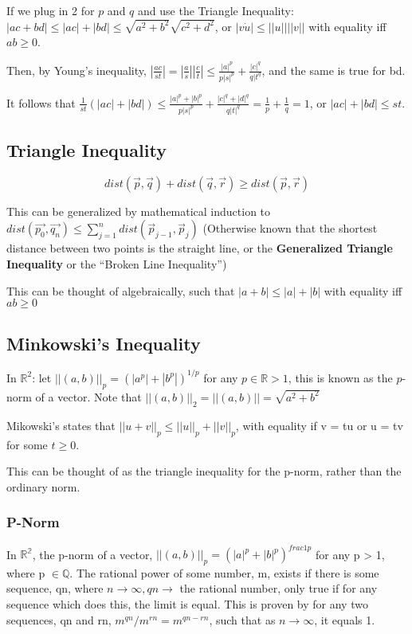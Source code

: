 If we plug in 2 for $p$ and $q$ and use the Triangle Inequality:
$|ac + bd| \leq |ac| + |bd| \leq \sqrt{a^2 + b^2} \sqrt{c^2 + d^2}$, or $|v \dot u| \leq ||u||||v||$ with equality iff $ab \geq 0$.

Then, by Young's inequality, $|\frac{ac}{st}| = |\frac{a}{s}||\frac{c}{t}| \leq \frac{|a|^p}{p|s|^p} + \frac{|c|^q}{q|t^q}$, and the same is true for bd.

It follows that $\frac{1}{st}(|ac| + |bd|) \leq \frac{|a|^p + |b|^p}{p|s|^p} + \frac{|c|^q + |d|^q}{q|t|^q} = \frac{1}{p} + \frac{1}{q} = 1$, or $|ac| + |bd| \leq st$.

\subsection{Triangle Inequality}
$$dist(\vec{p}, \vec{q}) + dist(\vec{q}, \vec{r}) \geq dist(\vec{p}, \vec{r})$$

This can be generalized by mathematical induction to $dist(\vec{p_0}, \vec{q_n})
\leq \sum_{j = 1}^n dist(\vec{p}_{j - 1}, \vec{p}_{j})$ (Otherwise known that the
shortest distance between two points is the straight line, or the \textbf{Generalized
Triangle Inequality} or the ``Broken Line Inequality'')

This can be thought of algebraically, such that $|a + b| \leq |a| + |b|$ with equality iff $ab \geq 0$

\subsection{Minkowski's Inequality}
In $\mathbb{R}^2$: let $||(a, b)||_p = (|a^p| + |b^p|)^{1/p}$ for any $p \in \mathbb{R} > 1$, this is known as the $p$-norm of a vector. Note that $||(a,b)||_2 = ||(a, b)|| = \sqrt{a^2 + b^2}$

Mikowski's states that $||u + v||_p \leq ||u||_p + ||v||_p$, with equality if v = tu or u = tv for some $t \geq 0$.

This can be thought of as the triangle inequality for the p-norm, rather than the ordinary norm.

\subsubsection{P-Norm}
In $\mathbb{R^2}$, the p-norm of a vector, $||(a, b)||_p = (|a|^p + |b|^p)^{frac{1}{p}}$ for any p > 1, where p $\in \mathbb{Q}$.
The rational power of some number, m,  exists if there is some sequence, qn, where $n \to \infty, qn \to$ the rational number, only true if for any sequence which does this, the limit is equal.
This is proven by for any two sequences, qn and rn, $m^{qn}/m^{rn} = m^{qn-rn}$, such that as $n \to \infty$, it equals 1.

